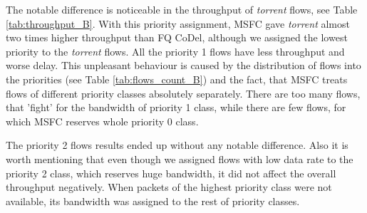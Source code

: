 The notable difference is noticeable in the throughput of \emph{torrent} flows, see Table \ref{tab:throughput_B}. With this priority assignment, MSFC gave \emph{torrent} almost two times higher throughput than FQ CoDel, although we assigned the lowest priority to the \emph{torrent} flows. All the priority 1 flows have less throughput and worse delay. This unpleasant behaviour is caused by the distribution of flows into the priorities (see Table \ref{tab:flows_count_B}) and the fact, that MSFC treats flows of different priority classes absolutely separately. There are too many flows, that 'fight' for the bandwidth of priority 1 class, while there are few flows, for which MSFC reserves whole priority 0 class.

The priority 2 flows results ended up without any notable difference. Also it is worth mentioning that even though we assigned flows with low data rate to the priority 2 class, which reserves huge bandwidth, it did not affect the overall throughput negatively. When packets of the highest priority class were not available, its bandwidth was assigned to the rest of priority classes.





